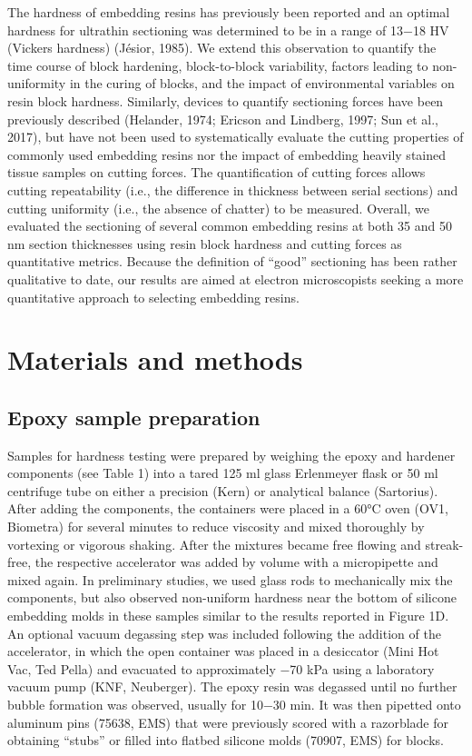 \documentclass{article}
\begin{document}
The hardness of embedding resins has previously been reported and an optimal hardness for ultrathin sectioning was determined to be in a range of 13−18 HV (Vickers hardness) (Jésior, 1985). We extend this observation to quantify the time course of block hardening, block-to-block variability, factors leading to non-uniformity in the curing of blocks, and the impact of environmental variables on resin block hardness. Similarly, devices to quantify sectioning forces have been previously described (Helander, 1974; Ericson and Lindberg, 1997; Sun et al., 2017), but have not been used to systematically evaluate the cutting properties of commonly used embedding resins nor the impact of embedding heavily stained tissue samples on cutting forces. The quantification of cutting forces allows cutting repeatability (i.e., the difference in thickness between serial sections) and cutting uniformity (i.e., the absence of chatter) to be measured. Overall, we evaluated the sectioning of several common embedding resins at both 35 and 50 nm section thicknesses using resin block hardness and cutting forces as quantitative metrics. Because the definition of “good” sectioning has been rather qualitative to date, our results are aimed at electron microscopists seeking a more quantitative approach to selecting embedding resins.

\section*{Materials and methods}

\subsection*{Epoxy sample preparation}

Samples for hardness testing were prepared by weighing the epoxy and hardener components (see Table 1) into a tared 125 ml glass Erlenmeyer flask or 50 ml centrifuge tube on either a precision (Kern) or analytical balance (Sartorius). After adding the components, the containers were placed in a 60°C oven (OV1, Biometra) for several minutes to reduce viscosity and mixed thoroughly by vortexing or vigorous shaking. After the mixtures became free flowing and streak-free, the respective accelerator was added by volume with a micropipette and mixed again. In preliminary studies, we used glass rods to mechanically mix the components, but also observed non-uniform hardness near the bottom of silicone embedding molds in these samples similar to the results reported in Figure 1D. An optional vacuum degassing step was included following the addition of the accelerator, in which the open container was placed in a desiccator (Mini Hot Vac, Ted Pella) and evacuated to approximately −70 kPa using a laboratory vacuum pump (KNF, Neuberger). The epoxy resin was degassed until no further bubble formation was observed, usually for 10−30 min. It was then pipetted onto aluminum pins (75638, EMS) that were previously scored with a razorblade for obtaining “stubs” or filled into flatbed silicone molds (70907, EMS) for blocks.
\end{document}
